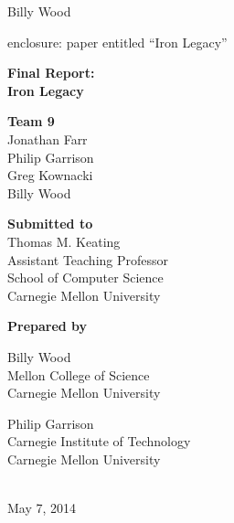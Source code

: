 \documentclass{article}
\begin{document}
\noindent
Billy Wood

\vfill

\noindent
enclosure: paper entitled ``Iron Legacy''

\clearpage

\thispagestyle{empty}

\begin{center}
\bf\large
Final Report:\\
\Huge
Iron Legacy
\end{center}

\vfill

\begin{center}
\textbf{Team 9}\\
Jonathan Farr\\
Philip Garrison\\
Greg Kownacki\\
Billy Wood
\end{center}

\vfill

\begin{center}
\textbf{Submitted to}\\
Thomas M. Keating\\
Assistant Teaching Professor\\
School of Computer Science\\
Carnegie Mellon University
\end{center}

\vfill

\begin{center}
\textbf{Prepared by}\\
\begin{minipage}[c][3.7em][t]{.45\textwidth}
\begin{center}
Billy Wood\\
Mellon College of Science\\
Carnegie Mellon University
\end{center}
\end{minipage}
\begin{minipage}[c][3.7em][t]{.45\textwidth}
\begin{center}
Philip Garrison\\
Carnegie Institute of Technology\\
Carnegie Mellon University
\end{center}
\end{minipage}\\
May 7, 2014
\end{center}
\end{document}
